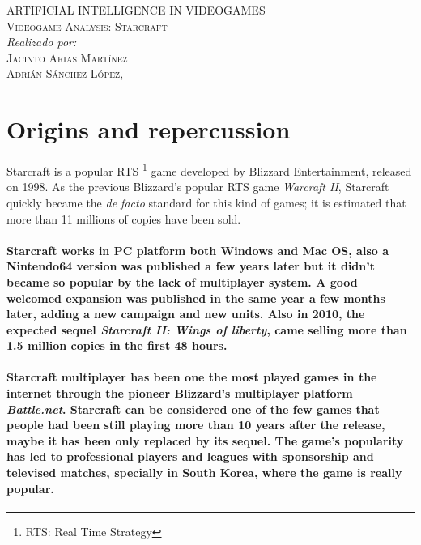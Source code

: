 \documentclass[a4paper,10pt]{article}
\newcommand{\titulo}[2]{ \begin{titlepage}\begin{center}\vspace*{\fill}\textsc{\Huge #1}\\[5cm]\textsc{\Large \underline{#2}}\\[5cm]\emph{Realizado por:}\\ \textsc{Jacinto Arias Martínez}\\ \textsc{Adrián Sánchez López}\vspace*{\fill}\vfill\monthname[\the\month],\, \the\year\end{center}\end{titlepage}}
\newcommand{\p}[1]{\paragraph{\indent\textnormal{#1}}}
\begin{document}
 \titulo{ARTIFICIAL INTELLIGENCE IN VIDEOGAMES}{Videogame Analysis: Starcraft}

    \begin{abstract}
    
    \end{abstract}

  \newpage

  \vspace*{3cm}
  \tableofcontents
  \vspace*{\fill}

  \newpage


\section{Origins and repercussion}

    Starcraft is a popular RTS \footnote{RTS: Real Time Strategy} game developed by Blizzard Entertainment, released on 1998. As the previous Blizzard's popular RTS game \textit{Warcraft II}, Starcraft quickly became the \textit{de facto} standard for this kind of games; it is estimated that more than 11 millions of copies have been sold.

    \p{Starcraft works in PC platform both Windows and Mac OS, also a Nintendo64 version was published a few years later but it didn't became so popular by the lack of multiplayer system. A good welcomed expansion was published in the same year a few months later, adding a new campaign and new units. Also in 2010, the expected sequel \textit{Starcraft II: Wings of liberty}, came selling more than 1.5 million copies in the first 48 hours.}

    \p{Starcraft multiplayer has been one the most played games in the internet through the pioneer Blizzard's multiplayer platform \textit{Battle.net}. Starcraft can be considered one of the few games that people had been still playing more than 10 years after the release, maybe it has been only replaced by its sequel. The game's popularity has led to professional players and leagues with sponsorship and televised matches, specially in South Korea, where the game is really popular.}
  
\end{document}
